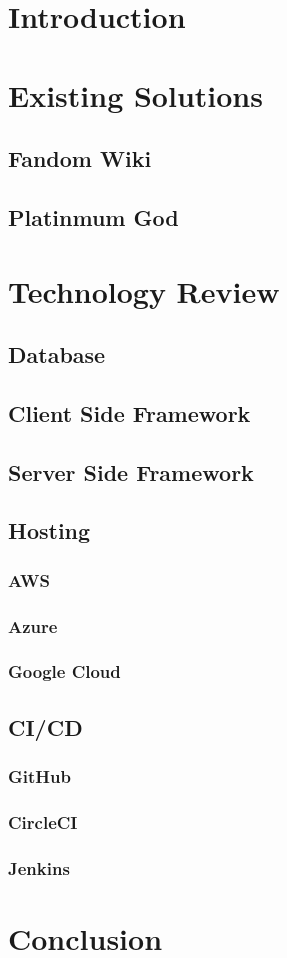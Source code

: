 \section{Introduction}
\section{Existing Solutions}
\subsection*{Fandom Wiki}
\subsection*{Platinmum God}
\section{Technology Review}
\subsection{Database}
\subsection{Client Side Framework}
\subsection{Server Side Framework}
\subsection{Hosting}
\subsubsection*{AWS}
\subsubsection*{Azure}
\subsubsection*{Google Cloud}
\subsection{CI/CD}
\subsubsection*{GitHub}
\subsubsection*{CircleCI}
\subsubsection*{Jenkins}
\section{Conclusion}